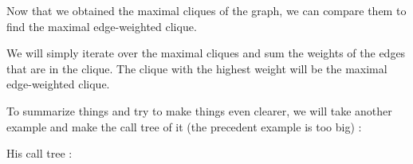 Now that we obtained the maximal cliques of the graph, we can compare them to find
the maximal edge-weighted clique. \newline

We will simply iterate over the maximal cliques and sum the weights of the edges
that are in the clique. The clique with the highest weight will be the maximal
edge-weighted clique. \newline

To summarize things and try to make things even clearer, we will take another example and make the call tree of it (the precedent example is too big) :

\begin{center}
\end{center}
His call tree :
